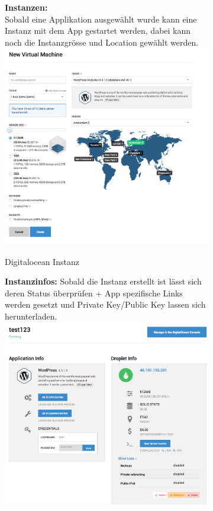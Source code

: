 \begin{figure}[!htbp]
   \begin{subfigure}[b]{.49\textwidth}
\textbf{Instanzen:}\\
Sobald eine Applikation ausgewählt wurde kann eine Instanz mit dem App gestartet 
werden, dabei kann noch die Instanzgrösse und Location gewählt werden.
\includegraphics[width=\textwidth]{./03_Analyse/03_Bitnami/images/digitalocean_size}
\caption{Digitalocean Instanz}
\end{subfigure}
  \hfill
 \begin{subfigure}[b]{.49\textwidth}
  \textbf{Instanzinfos:}
  Sobald die Instanz erstellt ist lässt sich deren Status überprüfen + App spezifische 
Links werden gesetzt und Private Key/Public Key lassen sich herunterladen.\\
\includegraphics[width=\textwidth]{./03_Analyse/03_Bitnami/images/digitalocean_instanceinfo}

\end{subfigure}
\end{figure}
